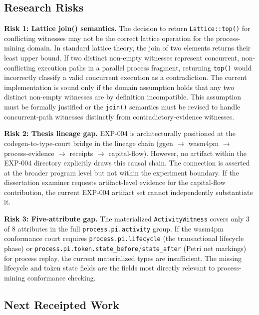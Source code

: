 \subsection{Research Risks}
\label{sec:otel-weaver-exp-004-registry-to-witness-risks}

\textbf{Risk 1: Lattice join() semantics.} The decision to return \texttt{Lattice::top()}
for conflicting witnesses may not be the correct lattice operation for the process-mining
domain. In standard lattice theory, the join of two elements returns their least upper
bound. If two distinct non-empty witnesses represent concurrent, non-conflicting execution
paths in a parallel process fragment, returning \texttt{top()} would incorrectly classify
a valid concurrent execution as a contradiction. The current implementation is sound only
if the domain assumption holds that any two distinct non-empty witnesses are by definition
incompatible. This assumption must be formally justified or the \texttt{join()} semantics
must be revised to handle concurrent-path witnesses distinctly from contradictory-evidence
witnesses.

\textbf{Risk 2: Thesis lineage gap.} EXP-004 is architecturally positioned at the
codegen-to-type-court bridge in the lineage chain
(ggen $\to$ wasm4pm $\to$ process-evidence $\to$ receipts $\to$ capital-flow). However,
no artifact within the EXP-004 directory explicitly draws this causal chain. The connection
is asserted at the broader program level but not within the experiment boundary. If the
dissertation examiner requests artifact-level evidence for the capital-flow contribution,
the current EXP-004 artifact set cannot independently substantiate it.

\textbf{Risk 3: Five-attribute gap.} The materialized \texttt{ActivityWitness} covers
only 3 of 8 attributes in the full \texttt{process.pi.activity} group. If the wasm4pm
conformance court requires \texttt{process.pi.lifecycle} (the transactional lifecycle
phase) or \texttt{process.pi.token.state\_before}/\texttt{state\_after} (Petri net
markings) for process replay, the current materialized types are insufficient. The missing
lifecycle and token state fields are the fields most directly relevant to process-mining
conformance checking.

\subsection{Next Receipted Work}
\label{sec:otel-weaver-exp-004-registry-to-witness-next-work}


